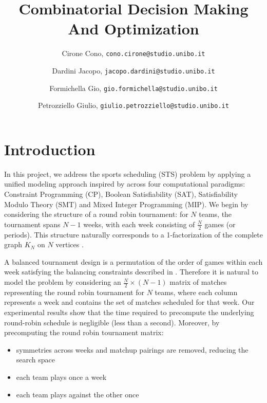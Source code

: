 \documentclass{article}
\title{Combinatorial Decision Making And Optimization}
\author{
  Cirone Cono, \texttt{cono.cirone@studio.unibo.it}
  \and
  Dardini Jacopo, \texttt{jacopo.dardini@studio.unibo.it}
  \and
  Formichella Gio, \texttt{gio.formichella@studio.unibo.it}
  \and
  Petrozziello Giulio, \texttt{giulio.petrozziello@studio.unibo.it} 
}
\date{}
\begin{document}
\maketitle


\section{Introduction}
In this project, we address the sports scheduling (STS) problem by applying a unified modeling approach inspired by \cite{10.1007/10704567_6} across four computational paradigms: Constraint Programming (CP), Boolean Satisfiability (SAT), Satisfiability Modulo Theory (SMT) and Mixed Integer Programming (MIP).
We begin by considering the structure of a round robin tournament: for $N$ teams, the tournament spans $N-1$ weeks, with each week consisting of $\frac{N}{2}$ games (or periods). This structure naturally corresponds to a 1-factorization of the complete graph $K_N$ on $N$ vertices \cite{Dinitz2006RoundRobin}.

A balanced tournament design is a permutation of the order of games within each week satisfying the balancing constraints described in \cite{Lamken2006BalancedTournamentDesigns}. 
Therefore it is natural to model the problem by considering an $\frac{N}{2}\times(N-1)$ matrix of matches representing the round robin tournament for $N$ teams, where each column represents a week and contains the set of matches scheduled for that week.
Our experimental results show that the time required to precompute the underlying round-robin schedule is negligible (less than a second).
Moreover, by precomputing the round robin tournament matrix: 
\begin{itemize}
  \item symmetries across weeks and matchup pairings are removed, reducing the search space
  \item each team plays once a week
  \item each team plays against the other once
\end{itemize}
\end{document}
